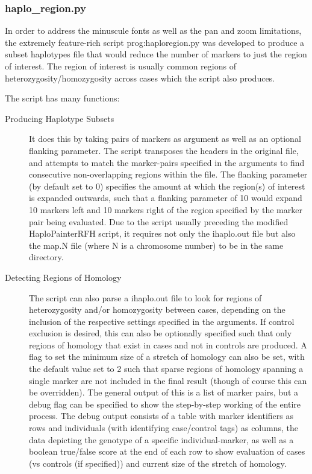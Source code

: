 \subsubsection{haplo\_region.py}

In order to address the minuscule fonts as well as the pan and zoom limitations, the extremely feature-rich script \gls{prog:haploregion.py} was developed to produce a subset haplotypes file that would reduce the number of markers to just the region of interest. The region of interest is usually common regions of heterozygosity/homozygosity across cases which the script also produces. 

The script has many functions:

\begin{description}
\item[Producing Haplotype Subsets]{It does this by taking pairs of markers as argument as well as an optional flanking parameter. The script transposes the headers in the original file, and attempts to match the marker-pairs specified in the arguments to find consecutive non-overlapping regions within the file. The flanking parameter (by default set to 0) specifies the amount at which the region(s) of interest is expanded outwards, such that a flanking parameter of 10 would expand 10 markers left and 10 markers right of the region specified by the marker pair being evaluated. Due to the script usually preceding the modified HaploPainterRFH script, it requires not only the ihaplo.out file but also the map.N file (where N is a chromosome number) to be in the same directory.}

\item[Detecting Regions of Homology]{The script can also parse a ihaplo.out file to look for regions of heterozygosity and/or homozygosity between cases, depending on the inclusion of the respective settings specified in the arguments. If control exclusion is desired, this can also be optionally specified such that only regions of homology that exist in cases and not in controls are produced. A flag to set the minimum size of a stretch of homology can also be set, with the default value set to 2 such that sparse regions of homology spanning a single marker are not included in the final result (though of course this can be overridden). The general output of this is a list of marker pairs, but a debug flag can be specified to show the step-by-step working of the entire process. The debug output consists of a table with marker identifiers as rows and individuals (with identifying case/control tags) as columns, the data depicting the genotype of a specific individual-marker, as well as a boolean true/false score at the end of each row to show evaluation of cases (vs controls (if specified)) and current size of the stretch of homology.}


\end{description}
